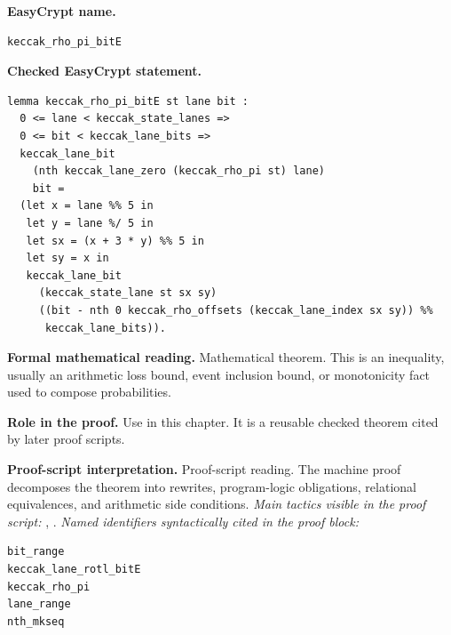 \begin{formaltheorem}
\noindent\textbf{EasyCrypt name.}
\begin{lstlisting}[language=EasyCrypt,basicstyle=\ttfamily\scriptsize]
keccak_rho_pi_bitE
\end{lstlisting}
\noindent\textbf{Checked EasyCrypt statement.}
\begin{lstlisting}[language=EasyCrypt,basicstyle=\ttfamily\scriptsize]
lemma keccak_rho_pi_bitE st lane bit :
  0 <= lane < keccak_state_lanes =>
  0 <= bit < keccak_lane_bits =>
  keccak_lane_bit
    (nth keccak_lane_zero (keccak_rho_pi st) lane)
    bit =
  (let x = lane %% 5 in
   let y = lane %/ 5 in
   let sx = (x + 3 * y) %% 5 in
   let sy = x in
   keccak_lane_bit
     (keccak_state_lane st sx sy)
     ((bit - nth 0 keccak_rho_offsets (keccak_lane_index sx sy)) %%
      keccak_lane_bits)).
\end{lstlisting}
\noindent\textbf{Formal mathematical reading.}
Mathematical theorem. This is an inequality, usually an arithmetic loss bound, event inclusion bound, or monotonicity fact used to compose probabilities.

\noindent\textbf{Role in the proof.}
Use in this chapter. It is a reusable checked theorem cited by later proof scripts.

\noindent\textbf{Proof-script interpretation.}
Proof-script reading. The machine proof decomposes the theorem into rewrites, program-logic obligations, relational equivalences, and arithmetic side conditions.
\emph{Main tactics visible in the proof script:} , .
\emph{Named identifiers syntactically cited in the proof block:}
\begin{lstlisting}[language=EasyCrypt,basicstyle=\ttfamily\scriptsize]
bit_range
keccak_lane_rotl_bitE
keccak_rho_pi
lane_range
nth_mkseq
\end{lstlisting}

\end{formaltheorem}

